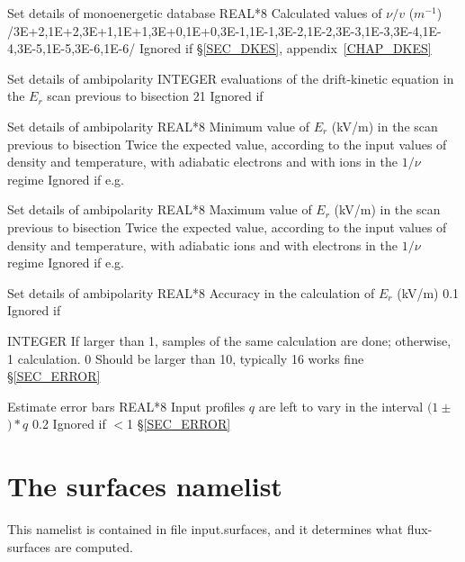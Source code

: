 {
{Set details of monoenergetic database}
{REAL*8}
{Calculated values of $\nu/v$ ($m^{-1}$)}
{/3E+2,1E+2,3E+1,1E+1,3E+0,1E+0,3E-1,1E-1,3E-2,1E-2,3E-3,1E-3,3E-4,1E-4,3E-5,1E-5,3E-6,1E-6/}
{Ignored if \notf{}}
{\S\ref{SEC_DKES}, appendix~\ref{CHAP_DKES}}

{Set details of ambipolarity}
{INTEGER}
{ evaluations of the drift-kinetic equation in the $E_r$ scan previous to bisection}
{21}
{Ignored if \notf{}}
{}%

{Set details of ambipolarity}
{REAL*8}
{Minimum value of $E_r$ (kV/m) in the scan previous to bisection}
{Twice the expected value, according to the input values of density and temperature, with adiabatic electrons and with ions in the $1/\nu$ regime}
{Ignored if \notf{}}
{e.g. \citep{maassberg1999densitycontrol}}

{Set details of ambipolarity}
{REAL*8}
{Maximum value of $E_r$ (kV/m) in the scan previous to bisection}
{Twice the expected value, according to the input values of density and temperature,  with adiabatic ions and with electrons in the $1/\nu$ regime}
{Ignored if \notf{}}
{e.g. \citep{maassberg1999densitycontrol}}

{Set details of ambipolarity}
{REAL*8}
{Accuracy in the calculation of $E_r$ (kV/m)}
{0.1}
{Ignored if \notf{}}
{}%

{}
{INTEGER}
{If larger than 1,  samples of the same calculation are done; otherwise, 1 calculation.}
{0}
{Should be larger than 10, typically 16 works fine}
{\S\ref{SEC_ERROR}}

{Estimate error bars}
{REAL*8}
{Input profiles $q$ are left to vary in the interval $(1\pm $$)*q$}
{0.2}
{Ignored if $<$1}
{\S\ref{SEC_ERROR}}




\section{The {\ttfamily surfaces} namelist}\label{SEC_SURF}

This namelist is contained in file {\ttfamily input.surfaces}, and it determines what flux-surfaces are computed. 

}
